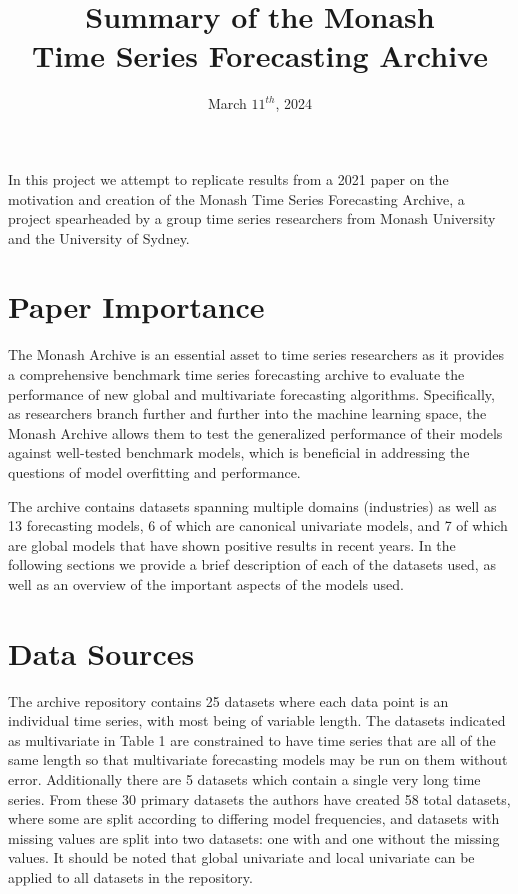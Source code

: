 \documentclass{article}
\title{Summary of the Monash \\ Time Series Forecasting Archive}
\date{March $11^{th}$, 2024}
\begin{document}
\maketitle

In this project we attempt to replicate results from a 2021 paper on the motivation and creation of the Monash Time Series Forecasting Archive, a project spearheaded by a group time series researchers from Monash University and the University of Sydney.

\section{Paper Importance}
The Monash Archive is an essential asset to time series researchers as it provides a comprehensive benchmark time series forecasting archive to evaluate the performance of new global and multivariate forecasting algorithms. Specifically, as researchers branch further and further into the machine learning space, the Monash Archive allows them to test the generalized performance of their models against well-tested benchmark models, which is beneficial in addressing the questions of model overfitting and performance. 

The archive contains datasets spanning multiple domains (industries) as well as 13 forecasting models, 6 of which are canonical univariate models, and 7 of which are global models that have shown positive results in recent years. In the following sections we provide a brief description of each of the datasets used, as well as an overview of the important aspects of the models used. 

\section{Data Sources}
The archive repository contains 25 datasets where each data point is an individual time series, with most being of variable length. The datasets indicated as multivariate in Table 1 are constrained to have time series that are all of the same length so that multivariate forecasting models may be run on them without error. Additionally there are 5 datasets which contain a single very long time series. From these 30 primary datasets the authors have created 58 total datasets, where some are split according to differing model frequencies, and  datasets with missing values are split into two datasets: one with and one without the missing values. It should be noted that global univariate and local univariate can be applied to all datasets in the repository.
\end{document}
